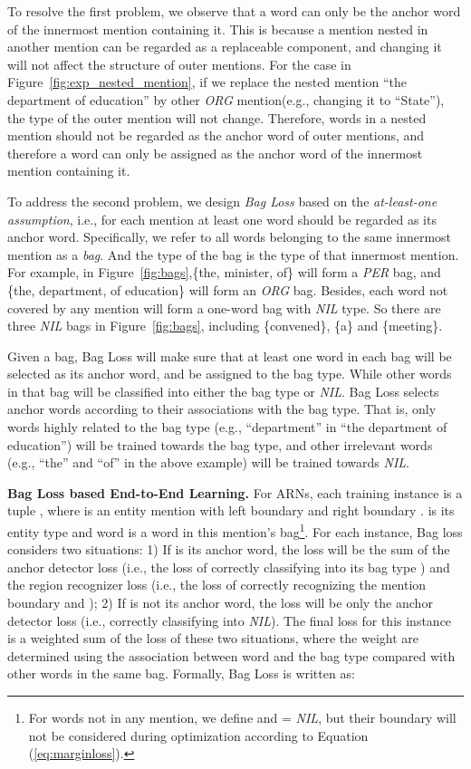 \documentclass[11pt,a4paper]{article}
\begin{document}
To resolve the first problem, we observe that a word can only be the anchor word of the innermost mention containing it. This is because a mention nested in another mention can be regarded as a replaceable component, and changing it will not affect the structure of outer mentions. For the case in Figure~\ref{fig:exp_nested_mention}, if we replace the nested mention ``the department of education'' by other \emph{ORG} mention(e.g., changing it to ``State''), the type of the outer mention will not change. Therefore, words in a nested mention should not be regarded as the anchor word of outer mentions, and therefore a word can only be assigned as the anchor word of the innermost mention containing it.

To address the second problem, we design \emph{Bag Loss} based on the \emph{at-least-one assumption}, i.e., for each mention at least one word should be regarded as its anchor word. Specifically, we refer to all words belonging to the same innermost mention as a \emph{bag}. And the type of the bag is the type of that innermost mention.
For example, in Figure~\ref{fig:bags},\{the, minister, of\} will form a \emph{PER} bag, and \{the, department, of education\} will form an \emph{ORG} bag. Besides, each word not covered by any mention will form a one-word bag with \emph{NIL} type. So there are three \emph{NIL} bags in Figure~\ref{fig:bags}, including \{convened\}, \{a\} and \{meeting\}.

Given a bag, Bag Loss will make sure that at least one word in each bag will be selected as its anchor word, and be assigned to the bag type. While other words in that bag will be classified into either the bag type or \emph{NIL}. Bag Loss selects anchor words according to their associations with the bag type. That is, only words highly related to the bag type (e.g., ``department'' in ``the department of education'') will be trained towards the bag type, and other irrelevant words (e.g., ``the'' and ``of'' in the above example) will be trained towards \emph{NIL}.

\noindent \textbf{Bag Loss based End-to-End Learning.} For ARNs, each training instance is a tuple , where  is an entity mention with left boundary  and right boundary .  is its entity type and word  is a word in this mention's bag\footnote{For words not in any mention, we define  and  = \emph{NIL}, but their boundary will not be considered during optimization according to Equation (\ref{eq:marginloss}).}. For each instance, Bag loss considers two situations: 1) If  is its anchor word, the loss will be the sum of the anchor detector loss (i.e., the loss of correctly classifying  into its bag type ) and the region recognizer loss (i.e., the loss of correctly recognizing the mention boundary  and ); 2) If  is not its anchor word, the loss will be only the anchor detector loss (i.e., correctly classifying  into \emph{NIL}). The final loss for this instance is a weighted sum of the loss of these two situations, where the weight are determined using the association between word  and the bag type  compared with other words in the same bag. Formally, Bag Loss is written as:
\end{document}
